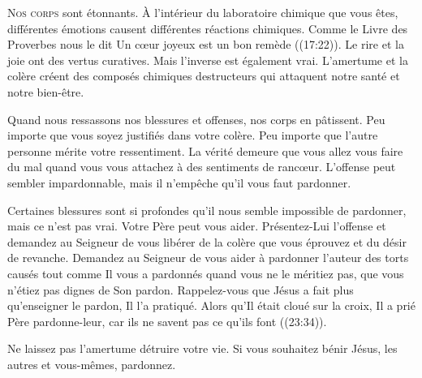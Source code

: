 \dvrule






\lettrine{N}{os corps} sont étonnants. À l'intérieur du laboratoire
 chimique que vous êtes, différentes émotions causent différentes
 réactions chimiques. Comme le Livre des Proverbes nous le dit\frcolon{} 
 \Og Un c\oe{}ur joyeux est un bon remède \Fg{} ((17:22)).
 Le rire et la joie ont des vertus curatives.
 Mais l'inverse est également vrai. L'amertume et la colère
 créent des composés chimiques destructeurs qui attaquent
 notre santé et notre bien-être.


Quand nous ressassons nos blessures et offenses, nos corps en pâtissent.
 Peu importe que vous soyez justifiés dans votre colère.
 Peu importe que l'autre personne mérite votre ressentiment.
 La vérité demeure que vous allez vous faire du mal quand vous vous
 attachez à des sentiments de ranc\oe{}ur.
 L'offense peut sembler impardonnable,
 mais il n'empêche qu'il vous faut pardonner.

Certaines blessures sont si profondes qu'il nous semble impossible
 de pardonner, mais ce n'est pas vrai. Votre Père peut vous aider.
 Présentez-Lui  l'offense et demandez 
 au Seigneur de vous libérer de la colère que vous éprouvez
 et du désir de revanche. Demandez au Seigneur de vous aider à pardonner
 l'auteur des torts causés \ocadr tout comme Il vous a pardonnés
 quand vous ne le méritiez pas, que vous n'étiez pas dignes de Son pardon.
 Rappelez-vous que Jésus a fait plus qu'enseigner le pardon, Il l'a pratiqué.
 Alors qu'Il était cloué sur la croix, Il a prié\frcolon{} 
 \Og Père pardonne-leur, car ils ne savent pas ce qu'ils font \Fg{}
 ((23:34)).

Ne laissez pas l'amertume détruire votre vie.
 Si vous souhaitez bénir Jésus, les autres et vous-mêmes, pardonnez.

